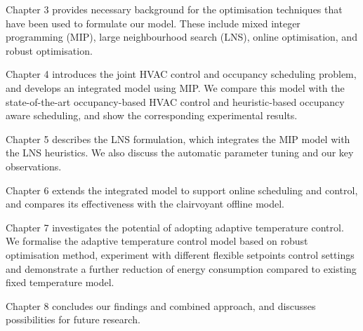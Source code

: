 Chapter 3 provides necessary background for the optimisation techniques that have been used to formulate our model. These include mixed integer programming (MIP), large neighbourhood search (LNS), online optimisation, and robust optimisation.

Chapter 4 introduces the joint HVAC control and occupancy scheduling problem, and develops an integrated model using MIP. We compare this model with the state-of-the-art occupancy-based HVAC control and heuristic-based occupancy aware scheduling, and show the corresponding experimental results.

Chapter 5 describes the LNS formulation, which integrates the MIP model with the LNS heuristics. We also discuss the automatic parameter tuning and our key observations.

Chapter 6 extends the integrated model to support online scheduling and control, and compares its effectiveness with the clairvoyant offline model.

Chapter 7 investigates the potential of adopting adaptive temperature control. We formalise the adaptive temperature control model based on robust optimisation method, experiment with different flexible setpoints control settings and demonstrate a further reduction of energy consumption compared to existing fixed temperature model.

Chapter 8 concludes our findings and combined approach, and discusses possibilities for future research.
